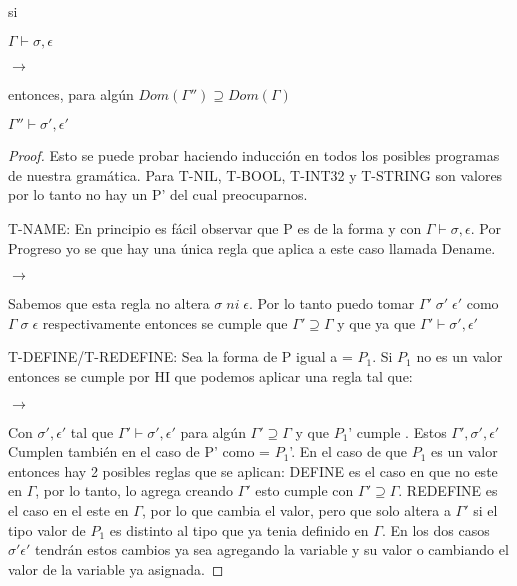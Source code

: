 \begin{theorem}[Preservacion]
    si


    $\Gamma \vdash \sigma, \epsilon$

      $\rightarrow$  

    entonces, para algún $ Dom(\Gamma'') \supseteq  Dom(\Gamma)$


    $\Gamma'' \vdash \sigma', \epsilon'$

\end{theorem}

\begin{proof}
Esto se puede probar haciendo inducción en todos los posibles programas de nuestra
gramática. Para T-NIL, T-BOOL, T-INT32 y T-STRING son valores por lo tanto no hay un P' del cual preocuparnos.

T-NAME: En principio es fácil observar que P es de la forma  y  con $\Gamma \vdash \sigma, \epsilon$.
Por Progreso yo se que hay una única regla que aplica a este caso llamada Dename.

  $\rightarrow$  

Sabemos que esta regla no altera $\sigma \; ni \; \epsilon$.
Por lo tanto puedo tomar $\Gamma' \; \sigma' \; \epsilon'$ como $\Gamma \; \sigma \; \epsilon$ respectivamente entonces se cumple que $\Gamma' \supseteq  \Gamma$
y que  ya que $\Gamma' \vdash \sigma', \epsilon'$

T-DEFINE/T-REDEFINE: Sea la forma de P igual a   = $P_{1}$. Si $P_{1}$ no es un valor entonces se cumple por HI que podemos aplicar una regla tal que:

  $\rightarrow$ 

Con $\sigma', \epsilon'$ tal que $\Gamma' \vdash \sigma', \epsilon'$ para algún $\Gamma' \supseteq  \Gamma$ y que $P_{1}$' cumple .
Estos $\Gamma', \sigma', \epsilon'$ Cumplen también en el caso de P' como  = $P_{1}$'.
En el caso de  que $P_{1}$ es un valor entonces hay 2 posibles reglas que se aplican:
DEFINE es el caso en que  no este en $\Gamma$, por lo tanto, lo agrega creando $\Gamma'$ esto cumple con  $\Gamma' \supseteq  \Gamma$.
REDEFINE es el caso en el  este en $\Gamma$, por lo que cambia el valor, pero que solo altera a $\Gamma'$ si el tipo valor de $P_{1}$ es distinto
al tipo que ya tenia definido en $\Gamma$. En los dos casos $\sigma' \epsilon'$ tendrán estos cambios ya sea agregando la variable y su valor o cambiando el valor
de la variable ya asignada.


\end{proof}
